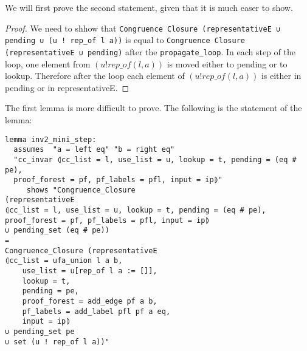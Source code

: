 We will first prove the second statement, given that it is much easer to show.

\begin{proof}
We need to shhow that \lstinline{Congruence Closure (representativeE ∪ pending ∪ (u ! rep_of l a))} is equal to \lstinline{Congruence Closure (representativeE ∪ pending)}  after the \lstinline{propagate_loop}. In each step of the loop, one element from $(u ! rep\_of(l, a))$ is moved either to pending or to lookup. Therefore after the loop each element of $(u ! rep\_of(l, a))$ is either in pending or in representativeE.
\end{proof}

The first lemma is more difficult to prove. The following is the statement of the lemma:

\begin{lstlisting}[label=lst:inv2_mini_step]
lemma inv2_mini_step:
  assumes  "a = left eq" "b = right eq"
  "cc_invar ⦇cc_list = l, use_list = u, lookup = t, pending = (eq # pe),
  proof_forest = pf, pf_labels = pfl, input = ip⦈"
     shows "Congruence_Closure
(representativeE
⦇cc_list = l, use_list = u, lookup = t, pending = (eq # pe),
proof_forest = pf, pf_labels = pfl, input = ip⦈
∪ pending_set (eq # pe))
=
Congruence_Closure (representativeE
⦇cc_list = ufa_union l a b,
    use_list = u[rep_of l a := []],
    lookup = t,
    pending = pe,
    proof_forest = add_edge pf a b,
    pf_labels = add_label pfl pf a eq,
    input = ip⦈
∪ pending_set pe
∪ set (u ! rep_of l a))"
\end{lstlisting}

